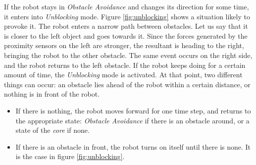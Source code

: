 \documentclass[oneside, a4paper, 12pt]{memoir}
\begin{document}
			If the robot stays in \emph{Obstacle Avoidance} and changes its direction for some time, it enters into \emph{Unblocking} mode. Figure \ref{fig:unblocking} shows a situation likely to provoke it. The robot enters a narrow path between obstacles. Let us say that it is closer to the left object and goes towards it. Since the forces generated by the proximity sensors on the left are stronger, the resultant is heading to the right, bringing the robot to the other obstacle. The same event occurs on the right side, and the robot returns to the left obstacle. If the robot keeps doing for a certain amount of time, the \emph{Unblocking} mode is activated. At that point, two different things can occur: an obstacle lies ahead of the robot within a certain distance, or nothing is in front of the robot.
			\begin{itemize}
				\item If there is nothing, the robot moves forward for one time step, and returns to the appropriate state: \emph{Obstacle Avoidance} if there is an obstacle around, or a state of the \emph{core} if none.
				\item If there is an obstacle in front, the robot turns on itself until there is none. It is the case in figure \ref{fig:unblocking}.
			\end{itemize}
			
\end{document}
